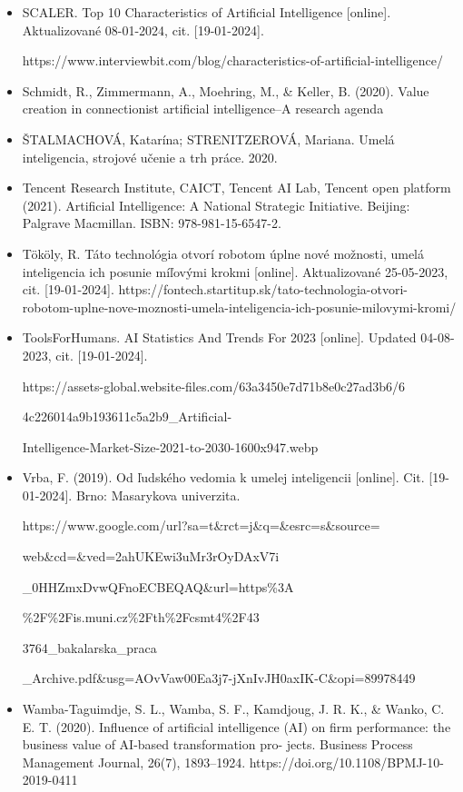 \begin{itemize}
    \item SCALER. Top 10 Characteristics of Artificial Intelligence [online]. Aktualizované  08-01-2024, cit. [19-01-2024]. \par https://www.interviewbit.com/blog/characteristics-of-artificial-intelligence/
    \item Schmidt, R., Zimmermann, A., Moehring, M., \& Keller, B. (2020). Value creation in connectionist artificial intelligence–A research agenda
    \item ŠTALMACHOVÁ, Katarína; STRENITZEROVÁ, Mariana. Umelá inteligencia, strojové učenie a trh práce. 2020.
    \item Tencent Research Institute, CAICT, Tencent AI Lab, Tencent open platform (2021). Artificial Intelligence: A National Strategic Initiative. Beijing: Palgrave Macmillan. ISBN: 978-981-15-6547-2.
    \item Tököly, R. Táto technológia otvorí robotom úplne nové možnosti, umelá inteligencia ich posunie míľovými krokmi [online]. Aktualizované  25-05-2023, cit. [19-01-2024]. https://fontech.startitup.sk/tato-technologia-otvori-robotom-uplne-nove-moznosti-umela-inteligencia-ich-posunie-milovymi-kromi/
    \item ToolsForHumans. AI Statistics And Trends For 2023 [online]. Updated 04-08-2023, cit. [19-01-2024]. \par https://assets-global.website-files.com/63a3450e7d71b8e0c27ad3b6/6\par 4c226014a9b193611c5a2b9\_Artificial- \par Intelligence-Market-Size-2021-to-2030-1600x947.webp
    \item Vrba, F. (2019). Od ľudského vedomia k umelej inteligencii [online]. Cit. [19-01-2024]. Brno: Masarykova univerzita. \par https://www.google.com/url?sa=t\&rct=j\&q=\&esrc=s\&source= 
\par web\&cd=\&ved=2ahUKEwi3uMr3rOyDAxV7i \par \_0HHZmxDvwQFnoECBEQAQ\&url=https\%3A\ 
  \par \%2F\%2Fis.muni.cz\%2Fth\%2Fcsmt4\%2F43 \par 3764\_bakalarska\_praca \par \_Archive.pdf\&usg=AOvVaw00Ea3j7-jXnIvJH0axIK-C\&opi=89978449
    \item Wamba-Taguimdje, S. L., Wamba, S. F., Kamdjoug, J. R. K., \& Wanko, C. E. T. (2020). Influence of artificial intelligence (AI) on firm performance: the business value of AI-based transformation pro- jects. Business Process Management Journal, 26(7), 1893–1924. https://doi.org/10.1108/BPMJ-10-2019-0411

\end{itemize}
